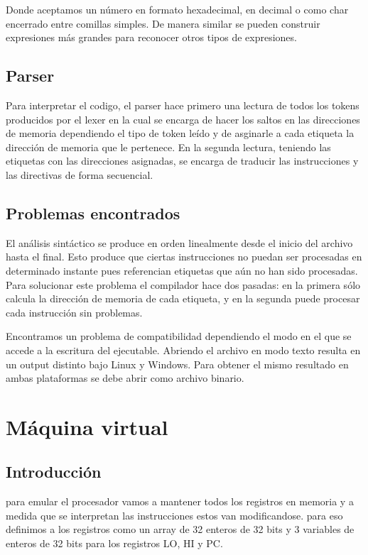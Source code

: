 \documentclass[12pt]{article}
\begin{document}
Donde aceptamos un número en formato hexadecimal, en decimal o como char encerrado entre comillas simples. De manera similar se pueden construir expresiones más grandes para reconocer otros tipos de expresiones.

\subsection{Parser}
Para interpretar el codigo, el parser hace primero una lectura de todos los tokens producidos por el lexer
en la cual se encarga de hacer los saltos en las direcciones de memoria dependiendo el tipo de token leído
y de asginarle a cada etiqueta la dirección de memoria que le pertenece.
En la segunda lectura, teniendo las etiquetas con las direcciones asignadas, se encarga de traducir las instrucciones
y las directivas de forma secuencial.


\subsection{Problemas encontrados}

	El análisis sintáctico se produce en orden linealmente desde el inicio del archivo hasta el final. Esto produce que ciertas instrucciones no puedan ser procesadas en determinado instante pues referencian etiquetas que aún no han sido procesadas. Para solucionar este problema el compilador hace dos pasadas: en la primera sólo calcula la dirección de memoria de cada etiqueta, y en la segunda puede procesar cada instrucción sin problemas.

    Encontramos un problema de compatibilidad dependiendo el modo en el que se accede a la escritura del ejecutable. Abriendo el archivo en modo texto resulta en un output distinto bajo Linux y Windows. Para obtener el mismo resultado en ambas plataformas se debe abrir como archivo binario.
   
\section{Máquina virtual}
\subsection{Introducción}
para emular el procesador vamos a mantener todos los registros en memoria y a
medida que se interpretan las instrucciones estos van modificandose.
para eso definimos a los registros como un array de 32 enteros de 32 bits
y 3 variables de enteros de 32 bits para  los registros LO, HI y PC.
\end{document}
